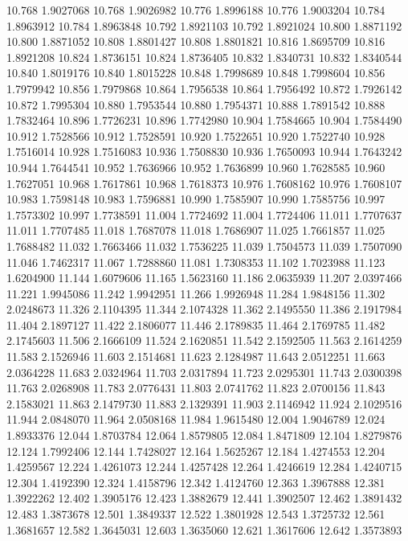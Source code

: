 10.768 1.9027068
10.768 1.9026982
10.776 1.8996188
10.776 1.9003204
10.784 1.8963912
10.784 1.8963848
10.792 1.8921103
10.792 1.8921024
10.800 1.8871192
10.800 1.8871052
10.808 1.8801427
10.808 1.8801821
10.816 1.8695709
10.816 1.8921208
10.824 1.8736151
10.824 1.8736405
10.832 1.8340731
10.832 1.8340544
10.840 1.8019176
10.840 1.8015228
10.848 1.7998689
10.848 1.7998604
10.856 1.7979942
10.856 1.7979868
10.864 1.7956538
10.864 1.7956492
10.872 1.7926142
10.872 1.7995304
10.880 1.7953544
10.880 1.7954371
10.888 1.7891542
10.888 1.7832464
10.896 1.7726231
10.896 1.7742980
10.904 1.7584665
10.904 1.7584490
10.912 1.7528566
10.912 1.7528591
10.920 1.7522651
10.920 1.7522740
10.928 1.7516014
10.928 1.7516083
10.936 1.7508830
10.936 1.7650093
10.944 1.7643242
10.944 1.7644541
10.952 1.7636966
10.952 1.7636899
10.960 1.7628585
10.960 1.7627051
10.968 1.7617861
10.968 1.7618373
10.976 1.7608162
10.976 1.7608107
10.983 1.7598148
10.983 1.7596881
10.990 1.7585907
10.990 1.7585756
10.997 1.7573302
10.997 1.7738591
11.004 1.7724692
11.004 1.7724406
11.011 1.7707637
11.011 1.7707485
11.018 1.7687078
11.018 1.7686907
11.025 1.7661857
11.025 1.7688482
11.032 1.7663466
11.032 1.7536225
11.039 1.7504573
11.039 1.7507090
11.046 1.7462317
11.067 1.7288860
11.081 1.7308353
11.102 1.7023988
11.123 1.6204900
11.144 1.6079606
11.165 1.5623160
11.186 2.0635939
11.207 2.0397466
11.221 1.9945086
11.242 1.9942951
11.266 1.9926948
11.284 1.9848156
11.302 2.0248673
11.326 2.1104395
11.344 2.1074328
11.362 2.1495550
11.386 2.1917984
11.404 2.1897127
11.422 2.1806077
11.446 2.1789835
11.464 2.1769785
11.482 2.1745603
11.506 2.1666109
11.524 2.1620851
11.542 2.1592505
11.563 2.1614259
11.583 2.1526946
11.603 2.1514681
11.623 2.1284987
11.643 2.0512251
11.663 2.0364228
11.683 2.0324964
11.703 2.0317894
11.723 2.0295301
11.743 2.0300398
11.763 2.0268908
11.783 2.0776431
11.803 2.0741762
11.823 2.0700156
11.843 2.1583021
11.863 2.1479730
11.883 2.1329391
11.903 2.1146942
11.924 2.1029516
11.944 2.0848070
11.964 2.0508168
11.984 1.9615480
12.004 1.9046789
12.024 1.8933376
12.044 1.8703784
12.064 1.8579805
12.084 1.8471809
12.104 1.8279876
12.124 1.7992406
12.144 1.7428027
12.164 1.5625267
12.184 1.4274553
12.204 1.4259567
12.224 1.4261073
12.244 1.4257428
12.264 1.4246619
12.284 1.4240715
12.304 1.4192390
12.324 1.4158796
12.342 1.4124760
12.363 1.3967888
12.381 1.3922262
12.402 1.3905176
12.423 1.3882679
12.441 1.3902507
12.462 1.3891432
12.483 1.3873678
12.501 1.3849337
12.522 1.3801928
12.543 1.3725732
12.561 1.3681657
12.582 1.3645031
12.603 1.3635060
12.621 1.3617606
12.642 1.3573893
